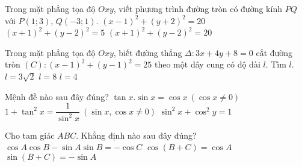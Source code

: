 \begin{ex}%
	Trong mặt phẳng tọa độ $Oxy$, viết phương trình đường tròn có đường kính $PQ$ với $P(1;3)$, $Q(-3;1)$.
	{$(x-1)^2+(y+2)^2=20$}
	{\True $(x+1)^2+(y-2)^2=5$}
	{$(x+1)^2+(y-2)^2=20$}
\end{ex}
\begin{ex}%
	Trong mặt phẳng tọa độ $Oxy$, biết đường thẳng $\Delta: 3x+4y+8=0$ cắt đường tròn $(C): (x-1)^2+(y-1)^2=25$ theo một dây cung có độ dài $l$. Tìm $l$.
	{$l=3\sqrt{2}$}
	{\True $l=8$}
	{$l=4$}
\end{ex}
\begin{ex}%
	Mệnh đề nào sau đây đúng?
	{$\tan x.\sin x=\cos x \ (\cos x\ne 0)$}
	{$1+\tan^2 x=\dfrac{1}{\sin^2x}\ (\sin x, \cos x \ne 0)$}
	{$\sin^2x+\cos^2y=1$}
\end{ex}

\begin{ex}%
	Cho tam giác $ABC$. Khẳng định nào sau đây đúng?
	{\True $\cos A\cos B-\sin A\sin B=-\cos C$}
	{$\cos(B+C)=\cos A$}
	{$\sin(B+C)=-\sin A$}
\end{ex}

